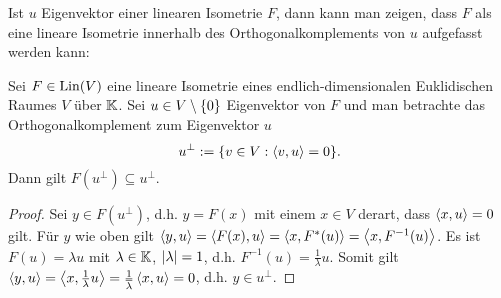 Ist $u$ Eigenvektor einer linearen Isometrie $F$, dann kann man zeigen, dass $F$ als eine lineare Isometrie innerhalb des Orthogonalkomplements von $u$ aufgefasst werden kann: 

\begin{propn}
	Sei $ F \in \operatorname{Lin}(V) $ eine lineare Isometrie eines endlich-dimensionalen Euklidischen Raumes $ V $ über $ \mathbb K $. Sei $ u \in V \setminus \left\{ 0 \right\} $ Eigenvektor von $ F $ und man betrachte das Orthogonalkomplement zum Eigenvektor $u$
	\[ u^\bot := \{ v \in V : \left\langle v,u \right\rangle = 0 \}.
	\] Dann gilt $ F(u^\bot) \subseteq u^\bot $.
\end{propn}
\begin{proof}
	Sei $ y \in F(u^\bot) $, d.h. $ y = F(x) $ mit einem $ x \in V $ derart, dass $ \left\langle x,u \right\rangle = 0 $ gilt. Für $ y $ wie oben gilt $ \left\langle y,u \right\rangle = \left\langle F(x),u \right\rangle = \left\langle x,F^\ast(u) \right\rangle = \left\langle x,F^{-1}(u) \right\rangle $. Es ist $ F(u) = \lambda u $ mit $ \lambda \in \mathbb K $, $ \left| \lambda \right| = 1 $, d.h. $ F^{-1}(u) = \frac{1}{\lambda} u $. Somit gilt $ \left\langle y,u \right\rangle = \left\langle x,\frac{1}{\lambda}u \right\rangle = \frac{1}{\overline{\lambda}} \left\langle x,u \right\rangle = 0 $, d.h. $ y \in u^\bot $.
\end{proof}


